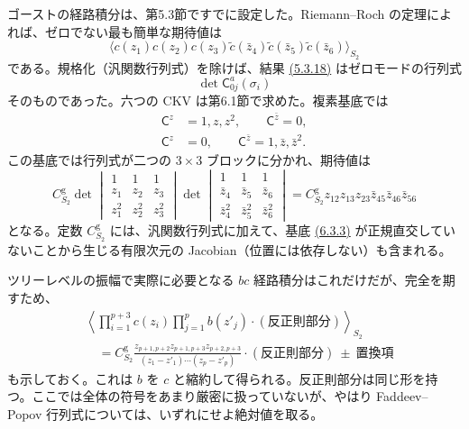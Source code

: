 \label{sec:6.3}


ゴーストの経路積分は、第5.3節ですでに設定した。Riemann--Roch の定理によれば、ゼロでない最も簡単な期待値は
\begin{equation}
\langle c(z_1)c(z_2)c(z_3)\widetilde c(\bar z_4)\widetilde c(\bar z_5)\widetilde c(\bar z_6)\rangle_{S_2}
\tag{6.3.1}\label{eq:6.3.1}
\end{equation}
である。規格化（汎関数行列式）を除けば、結果 \hyperref[eq:5.3.18]{(5.3.18)} はゼロモードの行列式
\begin{equation}
\det\mathsf C_{0j}^{a}(\sigma_i)
\tag{6.3.2}\label{eq:6.3.2}
\end{equation}
そのものであった。六つの CKV は第6.1節で求めた。複素基底では
\begin{align}
\mathsf C^z&=1,z,z^2,\qquad \mathsf C^{\bar z}=0,
\tag{6.3.3a}\label{eq:6.3.3a}\\
\mathsf C^z&=0,\qquad \mathsf C^{\bar z}=1,\bar z,\bar z^2.
\tag{6.3.3b}\label{eq:6.3.3b}
\end{align}
この基底では行列式が二つの $3\times3$ ブロックに分かれ、期待値は
\begin{equation}
C_{S_2}^{\mathrm g}\det\begin{vmatrix}
1&1&1\\z_1&z_2&z_3\\z_1^2&z_2^2&z_3^2
\end{vmatrix}
\det\begin{vmatrix}
1&1&1\\\bar z_4&\bar z_5&\bar z_6\\\bar z_4^2&\bar z_5^2&\bar z_6^2
\end{vmatrix}
=C_{S_2}^{\mathrm g}z_{12}z_{13}z_{23}\bar z_{45}\bar z_{46}\bar z_{56}
\tag{6.3.4}\label{eq:6.3.4}
\end{equation}
となる。定数 $C_{S_2}^{\mathrm g}$ には、汎関数行列式に加えて、基底 \hyperref[eq:6.3.3a]{(6.3.3)} が正規直交していないことから生じる有限次元の Jacobian（位置には依存しない）も含まれる。

ツリーレベルの振幅で実際に必要となる $bc$ 経路積分はこれだけだが、完全を期すため、
\begin{equation}
\begin{aligned}
&\left\langle\prod_{i=1}^{p+3}c(z_i)\prod_{j=1}^p b(z'_j)\cdot(\text{反正則部分})\right\rangle_{S_2}\\
&\quad=C_{S_2}^{\mathrm g}\frac{z_{p+1,p+2}z_{p+1,p+3}z_{p+2,p+3}}
{(z_1-z'_1)\cdots(z_p-z'_p)}\cdot(\text{反正則部分})
\ \pm\ \text{置換項}
\end{aligned}
\tag{6.3.5}\label{eq:6.3.5}
\end{equation}
も示しておく。これは $b$ を $c$ と縮約して得られる。反正則部分は同じ形を持つ。ここでは全体の符号をあまり厳密に扱っていないが、やはり Faddeev--Popov 行列式については、いずれにせよ絶対値を取る。

